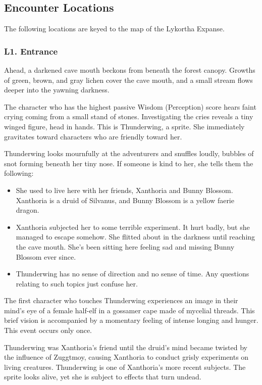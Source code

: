 \documentclass[10pt,a4paper,twoside,bg=print,twocolumn,openany,nodeprecatedcode]{dndbook}
\begin{document}
\subsection{Encounter Locations}
The following locations are keyed to the map of the Lykortha Expanse.

\subsubsection{L1. Entrance}
\begin{DndReadAloud}{}
Ahead, a darkened cave mouth beckons from beneath the forest canopy. Growths of green, brown, and gray lichen cover the cave mouth, and a small stream flows deeper into the yawning darkness.

\end{DndReadAloud}

The character who has the highest passive Wisdom (Perception) score hears faint crying coming from a small stand of stones. Investigating the cries reveals a tiny winged figure, head in hands. This is Thunderwing, a sprite. She immediately gravitates toward characters who are friendly toward her.

Thunderwing looks mournfully at the adventurers and snuffles loudly, bubbles of snot forming beneath her tiny nose. If someone is kind to her, she tells them the following:


\begin{itemize}
\item She used to live here with her friends, Xanthoria and Bunny Blossom. Xanthoria is a druid of Silvanus, and Bunny Blossom is a yellow faerie dragon.
\item Xanthoria subjected her to some terrible experiment. It hurt badly, but she managed to escape somehow. She flitted about in the darkness until reaching the cave mouth. She's been sitting here feeling sad and missing Bunny Blossom ever since.
\item Thunderwing has no sense of direction and no sense of time. Any questions relating to such topics just confuse her.
\end{itemize}

The first character who touches Thunderwing experiences an image in their mind's eye of a female half-elf in a gossamer cape made of mycelial threads. This brief vision is accompanied by a momentary feeling of intense longing and hunger. This event occurs only once.

Thunderwing was Xanthoria's friend until the druid's mind became twisted by the influence of Zuggtmoy, causing Xanthoria to conduct grisly experiments on living creatures. Thunderwing is one of Xanthoria's more recent subjects. The sprite looks alive, yet she is subject to effects that turn undead.
\end{document}
